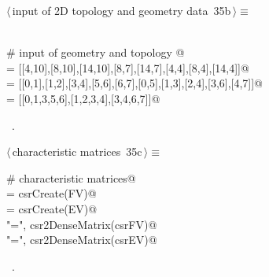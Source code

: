 \documentclass[11pt,oneside]{article}	%
\begin{document}
\begin{flushleft} \small \label{scrap61}
\protect{}$\langle\,$input of 2D topology and geometry data\nobreak\ {\footnotesize 35b}$\,\rangle\equiv$
\vspace{-1ex}
\begin{list}{}{} \item
\mbox{}\verb@@\\
\mbox{}\verb@# input of geometry and topology  @\\
\mbox{} = [[4,10],[8,10],[14,10],[8,7],[14,7],[4,4],[8,4],[14,4]]@\\
\mbox{}\verb@EV = [[0,1],[1,2],[3,4],[5,6],[6,7],[0,5],[1,3],[2,4],[3,6],[4,7]]@\\
\mbox{}\verb@FV = [[0,1,3,5,6],[1,2,3,4],[3,4,6,7]]@\\
\mbox{}\verb@@{\NWsep}
\end{list}
\vspace{-1ex}
\footnotesize\addtolength{\baselineskip}{-1ex}
\begin{list}{}{\setlength{\itemsep}{-\parsep}\setlength{\itemindent}{-\leftmargin}}
\item \NWtxtMacroRefIn\ .
\end{list}
\end{flushleft}

\begin{flushleft} \small \label{scrap62}
\protect{}$\langle\,$characteristic matrices\nobreak\ {\footnotesize 35c}$\,\rangle\equiv$
\vspace{-1ex}
\begin{list}{}{} \item
\mbox{}\verb@# characteristic matrices@\\
\mbox{}\verb@csrFV = csrCreate(FV)@\\
\mbox{}\verb@csrEV = csrCreate(EV)@\\
\mbox{}\verb@print "\nFV =\n", csr2DenseMatrix(csrFV)@\\
\mbox{}\verb@print "\nEV =\n", csr2DenseMatrix(csrEV)@\\
\mbox{}\verb@@{\NWsep}
\end{list}
\vspace{-1ex}
\footnotesize\addtolength{\baselineskip}{-1ex}
\begin{list}{}{\setlength{\itemsep}{-\parsep}\setlength{\itemindent}{-\leftmargin}}
\item \NWtxtMacroRefIn\ .
\end{list}
\end{flushleft}
\end{document}

